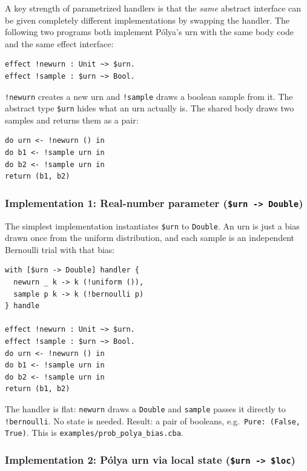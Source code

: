 \documentclass[11pt,a4paper]{article}
\begin{document}
A key strength of parametrized handlers is that the \emph{same} abstract
interface can be given completely different implementations by swapping the
handler.  The following two programs both implement P\'{o}lya's urn with the
same body code and the same effect interface:

\begin{lstlisting}
effect !newurn : Unit ~> $urn.
effect !sample : $urn ~> Bool.
\end{lstlisting}

\texttt{!newurn} creates a new urn and \texttt{!sample} draws a boolean sample
from it.  The abstract type \texttt{\$urn} hides what an urn actually is.  The
shared body draws two samples and returns them as a pair:

\begin{lstlisting}
do urn <- !newurn () in
do b1 <- !sample urn in
do b2 <- !sample urn in
return (b1, b2)
\end{lstlisting}

\subsubsection*{Implementation 1: Real-number parameter (\texttt{\$urn -> Double})}

The simplest implementation instantiates \texttt{\$urn} to \texttt{Double}.  An
urn is just a bias drawn once from the uniform distribution, and each sample is
an independent Bernoulli trial with that bias:

\begin{lstlisting}
with [$urn -> Double] handler {
  newurn _ k -> k (!uniform ()),
  sample p k -> k (!bernoulli p)
} handle

effect !newurn : Unit ~> $urn.
effect !sample : $urn ~> Bool.
do urn <- !newurn () in
do b1 <- !sample urn in
do b2 <- !sample urn in
return (b1, b2)
\end{lstlisting}

The handler is flat: \texttt{newurn} draws a \texttt{Double} and \texttt{sample}
passes it directly to \texttt{!bernoulli}.  No state is needed.  Result: a pair
of booleans, e.g.\ \texttt{Pure: (False, True)}.  This is
\texttt{examples/prob\_polya\_bias.cba}.

\subsubsection*{Implementation 2: P\'{o}lya urn via local state (\texttt{\$urn -> \$loc})}
\end{document}

